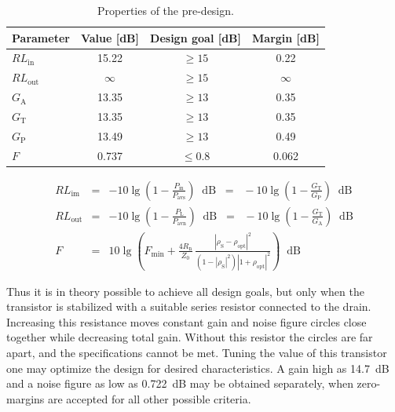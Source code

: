 \documentclass[a4paper, 12pt]{article}
\newlength{\oneLine}
\newcommand{\dB}{\mathrm{\;dB}}
\newcommand{\m}[1]{\mathrm{#1}}
\begin{document}
\begin{table}[!h]
	\begin{center}
		\caption{Properties of the pre-design.}
		\label{t:pre2}
		\renewcommand{\arraystretch}{1.2}
		\begin{tabular}{lccc}
			Parameter						&	Value [dB]	& Design goal [dB] 	& Margin [dB]	\\
			\hline
			$\mathit{RL}_\mathrm{in}$		&	15.22		& $\geq 15$ 		& 0.22			\\
			$\mathit{RL}_\mathrm{out}$		&	$\infty$	& $\geq 15$  		& $\infty$		\\
			$G_\mathrm{A}$					&	13.35		& $\geq 13$  		& 0.35			\\				
			$G_\mathrm{T}$					&	13.35		& $\geq 13$  		& 0.35			\\
			$G_\mathrm{P}$					&	13.49		& $\geq 13$  		& 0.49			\\
			$F$								&	0.737		& $\leq 0.8$ 		& 0.062				
		\end{tabular}
	\end{center}
	\vspace{-1\oneLine}
\end{table}

\begin{eqnarray}
\mathit{RL}_\m{im} 	&=& -10 \lg \left( 1 - \frac{P_\m{in}}{P_\m{avs}} \right) \;\dB \;\;=\;\; -10 \lg \left( 1 - \frac{G_\m{T}}{G_\m{P}} \right) \;\dB \label{e:RLin} \\
\mathit{RL}_\m{out} &=& -10 \lg \left( 1 - \frac{P_\m{L}}{P_\m{avn}} \right) \;\dB \;\;=\;\; -10 \lg \left( 1 - \frac{G_\m{T}}{G_\m{A}} \right) \;\dB \label{e:RLout} \\
F 					&=& 10 \lg \left( F_\m{min} + \frac{4 R_\mathrm{n}}{Z_0} \, \frac{ |\rho_\m{S} - \rho_\m{opt}|^2 }{(1 - |\rho_\m{S}|^2) |1 + \rho_\m{opt}|^2} \right) \;\dB \label{e:F}
\end{eqnarray}

Thus it is in theory possible to achieve all design goals, but only when the transistor 
is stabilized with a suitable series resistor connected to the drain. Increasing this resistance
moves constant gain and noise figure circles close together while decreasing total gain.
Without this resistor the circles are far apart, and the specifications cannot be met. 
Tuning the value of this transistor one may optimize the design for desired characteristics. 
A gain high as 14.7~dB and a noise figure as low as 0.722~dB may be obtained separately, 
when zero-margins are accepted for all other possible criteria.
\end{document}
